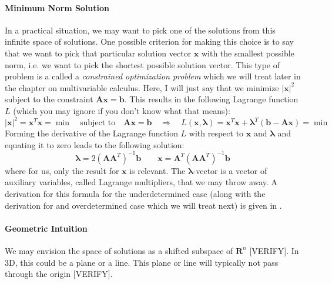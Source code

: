 \paragraph{Minimum Norm Solution}
In a practical situation, we may want to pick one of the solutions from this infinite space of solutions. One possible criterion for making this choice is to say that we want to pick that particular solution vector $\mathbf{x}$ with the smallest possible norm, i.e. we want to pick the shortest possible solution vector. This type of problem is a called a \emph{constrained optimization problem} which we will treat later in the chapter on multivariable calculus. Here, I will just say that we minimize $|\mathbf{x}|^2$ subject to the constraint $\mathbf{A x} = \mathbf{b}$. This results in the following Lagrange function $L$ (which you may ignore if you don't know what that means):
\begin{equation}
|\mathbf{x}|^2 = \mathbf{x}^T \mathbf{x} = \min 
\quad \text{subject to} \quad 
\mathbf{A x} = \mathbf{b}
\quad \Rightarrow \quad
L(\mathbf{x}, \boldsymbol{\lambda}) 
= \mathbf{x}^T \mathbf{x} + \boldsymbol{\lambda}^T (\mathbf{b} - \mathbf{A x}) = \min
\end{equation}
Forming the derivative of the Lagrange function $L$ with respect to $\mathbf{x}$ and $\boldsymbol{\lambda}$ and equating it to zero leads to the following solution:
\begin{equation}
\boldsymbol{\lambda} = 2 (\mathbf{A} \mathbf{A}^T)^{-1} \mathbf{b}
\qquad
\boxed{\mathbf{x} = \mathbf{A}^T (\mathbf{A} \mathbf{A}^T)^{-1} \mathbf{b}}
\end{equation}
where for us, only the result for $\mathbf{x}$ is relevant. The $\boldsymbol{\lambda}$-vector is a vector of auxiliary variables, called Lagrange multipliers, that we may throw away. A derivation for this formula for the underdetermined case (along with the derivation for and overdetermined case which we will treat next) is given in \cite{LinSysOverUnder}.

\paragraph{Geometric Intuition}
We may envision the space of solutions as a shifted subspace of $\mathbf{R}^n$ [VERIFY]. In 3D, this could be a plane or a line. This plane or line will typically not pass through the origin [VERIFY].

